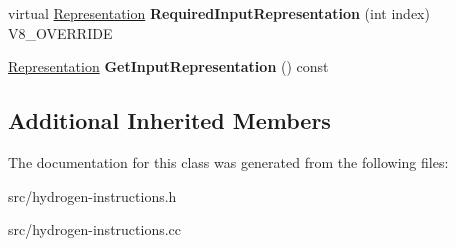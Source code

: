 \begin{DoxyCompactItemize}
\item 
\hypertarget{classv8_1_1internal_1_1_h_string_compare_and_branch_a897131f423dfa72b5fc81c89cb4649c0}{}virtual \hyperlink{classv8_1_1internal_1_1_representation}{Representation} {\bfseries Required\+Input\+Representation} (int index) V8\+\_\+\+O\+V\+E\+R\+R\+I\+D\+E\label{classv8_1_1internal_1_1_h_string_compare_and_branch_a897131f423dfa72b5fc81c89cb4649c0}

\item 
\hypertarget{classv8_1_1internal_1_1_h_string_compare_and_branch_a30faba1d69f166e854847e126b46d27e}{}\hyperlink{classv8_1_1internal_1_1_representation}{Representation} {\bfseries Get\+Input\+Representation} () const \label{classv8_1_1internal_1_1_h_string_compare_and_branch_a30faba1d69f166e854847e126b46d27e}

\end{DoxyCompactItemize}
\subsection*{Additional Inherited Members}


The documentation for this class was generated from the following files\+:\begin{DoxyCompactItemize}
\item 
src/hydrogen-\/instructions.\+h\item 
src/hydrogen-\/instructions.\+cc\end{DoxyCompactItemize}
